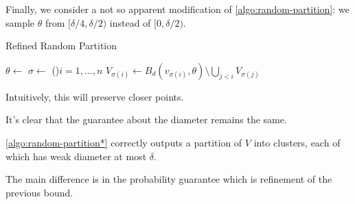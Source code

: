 Finally, we consider a not so apparent modification of \autoref{algo:random-partition}: we sample \(\theta \) from \([\delta / 4, \delta / 2)\) instead of \([0, \delta / 2)\).

\begin{algorithm}[H]\label{algo:random-partition*}
  \DontPrintSemicolon{}
  \caption{Refined Random Partition~\cite{calinescu2005approximation}}

  \BlankLine

  \(\theta \gets\)\uniform{\([\delta / 4, \delta / 2)\)}\;
  \(\sigma \gets\)
  \For(){\(i = 1, \dots , n\)}{
    \(V_{\sigma (i)} \gets B_d(v_{\sigma (i)}, \theta ) \setminus \bigcup_{j < i} V_{\sigma (j)}\)\;
  }
  \;
\end{algorithm}

\begin{intuition}
  Intuitively, this will preserve closer points.
\end{intuition}

It's clear that the guarantee about the diameter remains the same.

\begin{claim}
  \autoref{algo:random-partition*} correctly outputs a partition of \(V\) into clusters, each of which has weak diameter at most \(\delta \).
\end{claim}

The main difference is in the probability guarantee which is refinement of the previous bound.

